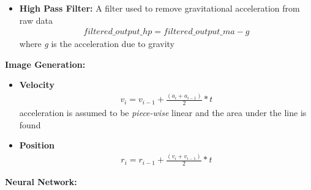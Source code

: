 \documentclass[a4paper, oneside,11pt]{article}
\begin{document}
\begin{itemize}
	\item \textbf{High Pass Filter:}
		A filter used to remove gravitational acceleration from raw data 
		\begin{eqnarray}
		  filtered\_output\_hp = filtered\_output\_ma - \textit{g}
		\end{eqnarray}
		where \textit{g} is the acceleration due to gravity
\end{itemize}

\textbf{Image Generation:}

\begin{itemize}
	\item \textbf{Velocity}
		\begin{eqnarray}
		  v_i = v_{i-1} + \frac{(a_i + a_{i-1})}{2}*t
		\end{eqnarray}
		acceleration is assumed to be \textit{piece-wise} linear and the area under the line is found

	\item \textbf{Position}
		\begin{eqnarray}
		  r_i = r_{i-1} + \frac{(v_i + v_{i-1})}{2}*t
		\end{eqnarray}
\end{itemize}

\textbf{Neural Network:}
\end{document}
